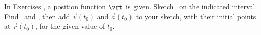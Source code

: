 {\noindent In Exercises}
{ , a position function $\vrt$ is given. Sketch \vrt\ on the indicated interval. Find \vvt\ and \vat, then add $\vec v(t_0)$ and $\vec a(t_0)$ to your sketch, with their initial points at $\vec r(t_0)$, for the given value of $t_0$.
}
